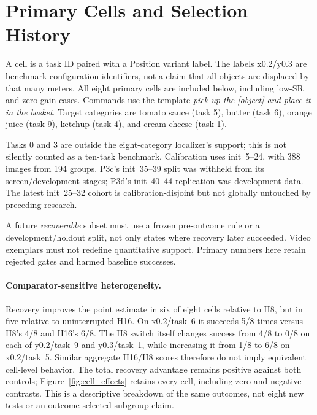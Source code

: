 \documentclass{article}
\begin{document}


\clearpage
\appendix

\section{Primary Cells and Selection History}
\label{app:cells}
A cell is a task ID paired with a Position variant label. The labels
x0.2/y0.3 are benchmark configuration identifiers, not a claim that all objects
are displaced by that many meters.
All eight primary cells are included below, including low-SR and zero-gain
cases. Commands use the template \emph{pick up the [object] and place it in the basket}.
Target categories are tomato sauce (task 5), butter (task 6), orange juice
(task 9), ketchup (task 4), and cream cheese (task 1).

\begin{table}[ht]
\caption{Historical primary confirmation, init~25--32 per cell.
H16 is uninterrupted max-value; H8 and recovery branch at 72.}
\centering\small
\end{table}

Tasks 0 and 3 are outside the eight-category localizer's support; this is not
silently counted as a ten-task benchmark.
Calibration uses init~5--24, with 388 images from 194 groups.
P3c's init~35--39 split was withheld from its screen/development stages;
P3d's init~40--44 replication was development data.
The latest init~25--32 cohort is calibration-disjoint but not globally
untouched by preceding research.

A future \emph{recoverable} subset must use a frozen pre-outcome rule or a
development/holdout split, not only states where recovery later succeeded.
Video exemplars must not redefine quantitative support.
Primary numbers here retain rejected gates and harmed baseline successes.

\paragraph{Comparator-sensitive heterogeneity.}
Recovery improves the point estimate in six of eight cells relative to H8,
but in five relative to uninterrupted H16. On x0.2/task~6 it succeeds 5/8
times versus H8's 4/8 and H16's 6/8. The H8 switch itself changes success
from 4/8 to 0/8 on each of y0.2/task~9 and y0.3/task~1, while increasing it
from 1/8 to 6/8 on x0.2/task~5. Similar aggregate H16/H8 scores therefore
do not imply equivalent cell-level behavior. The total recovery advantage
remains positive against both controls; Figure~\ref{fig:cell_effects} retains
every cell, including zero and negative contrasts.
This is a descriptive breakdown of the same outcomes, not eight new tests
or an outcome-selected subgroup claim.
\end{document}
